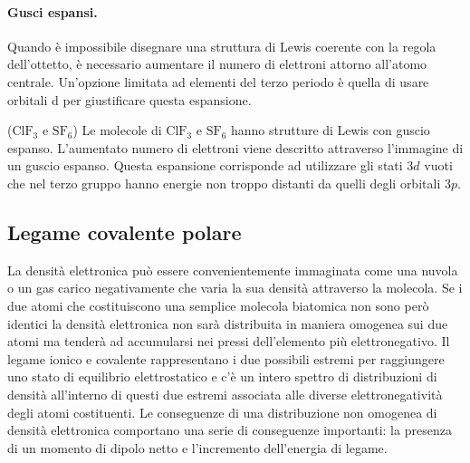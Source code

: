 \paragraph{Gusci espansi.} Quando è impossibile disegnare una struttura di Lewis coerente con la regola dell'ottetto, è necessario aumentare il numero di elettroni attorno all'atomo centrale. Un'opzione limitata ad elementi del terzo periodo è quella di usare orbitali d per giustificare questa espansione.
\begin{ex}($\text{ClF}_3$ e $\text{SF}_6$)
    Le molecole di $\text{ClF}_3$ e $\text{SF}_6$ hanno strutture di Lewis con guscio espanso. L'aumentato numero di elettroni viene descritto attraverso l'immagine di un guscio espanso. Questa espansione corrisponde ad utilizzare gli stati $3d$ vuoti che nel terzo gruppo hanno energie non troppo distanti da quelli degli orbitali $3p$.
\end{ex}

\subsection{Legame covalente polare}
La densità elettronica può essere convenientemente immaginata come una nuvola o un gas carico negativamente che varia la sua densità attraverso la molecola. Se i due atomi che costituiscono una semplice molecola biatomica non sono però identici la densità elettronica non sarà distribuita in maniera omogenea sui due atomi ma tenderà ad accumularsi nei pressi dell'elemento più elettronegativo. Il legame ionico e covalente rappresentano i due possibili estremi per raggiungere uno stato di equilibrio elettrostatico e c'è un intero spettro di distribuzioni di densità all'interno di questi due estremi associata alle diverse elettronegatività degli atomi costituenti. Le conseguenze di una distribuzione non omogenea di densità elettronica comportano una serie di conseguenze importanti: la presenza di un momento di dipolo netto e l'incremento dell'energia di legame. 

